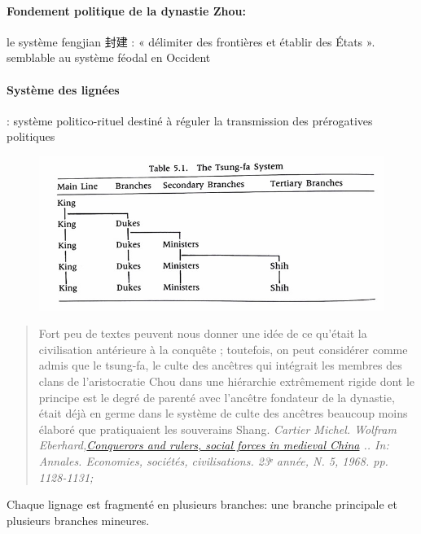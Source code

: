 \paragraph{Fondement politique de la dynastie Zhou:}  le système fengjian   封建 : « délimiter des frontières et établir des États ».	semblable au système féodal en Occident



\paragraph{Système des lignées } : système politico-rituel destiné à réguler la transmission des prérogatives politiques

\begin{figure}[!h]
    \centering
    \includegraphics[width=\textwidth]{ConfucianismeTaoismeBouddhismeChinois/Images/SytemeLignee.jpg}

    \label{fig:enter-label}
\end{figure}

\begin{quote}
    Fort peu de textes
peuvent nous donner une idée de ce qu'était la civilisation antérieure à la
conquête ; toutefois, on peut considérer comme admis que le tsung-fa, le
culte des ancêtres qui intégrait les membres des clans de l'aristocratie Chou
dans une hiérarchie extrêmement rigide dont le principe est le degré de
parenté avec l'ancêtre fondateur de la dynastie, était déjà en germe dans
le système de culte des ancêtres beaucoup moins élaboré que pratiquaient
les souverains Shang. \textit{ \small Cartier Michel. Wolfram Eberhard,\href{https://www.persee.fr/doc/ahess_0395-2649_1968_num_23_5_421998_t1_1128_0000_2}{Conquerors and rulers, social forces in medieval China} .. In: Annales. Economies, sociétés,
civilisations. 23ᵉ année, N. 5, 1968. pp. 1128-1131;} 

\end{quote}
Chaque lignage est fragmenté en plusieurs branches: une branche principale et plusieurs branches mineures.


